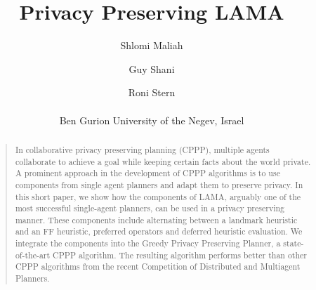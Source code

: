 \documentclass[letterpaper]{article}
\theoremstyle{definition}
\begin{document}
%
\title{Privacy Preserving LAMA}
\author{Shlomi Maliah \and Guy Shani \and Roni Stern\\\\
Ben Gurion University of the Negev, Israel\\
}
\maketitle

\begin{abstract}
\begin{quote}
In collaborative privacy preserving planning (CPPP), multiple agents collaborate to achieve a goal while keeping certain facts about the world private. A prominent approach in the development of CPPP algorithms is to use components from single agent planners and adapt them to preserve privacy. In this short paper, we show how the components of LAMA, arguably one of the most successful single-agent planners, can be used in a privacy preserving manner. These components include alternating between a landmark heuristic and an FF heuristic, preferred operators and deferred heuristic evaluation. We integrate the components into the Greedy Privacy Preserving Planner, a state-of-the-art CPPP algorithm. The resulting algorithm performs better than other CPPP algorithms from the recent Competition of Distributed and Multiagent Planners. 
\end{quote}
\end{abstract}
\end{document}
